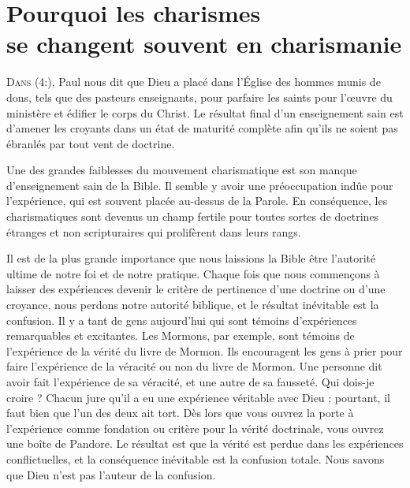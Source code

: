 \chapter[Pourquoi les charismes se changent souvent en charismanie]{Pourquoi les charismes\\ se changent souvent en charismanie}
\renewcommand{\chaphead}{{\fontspec{Linux Libertine O} Pourquoi les charismes se changent souvent en charismanie}}

\lettrine{D}{ans (4:),}
 Paul nous dit que Dieu a placé dans l'Église
 des hommes munis de dons, tels que des pasteurs enseignants,
 pour parfaire les saints pour l'œuvre du ministère et édifier le corps
 du Christ. Le résultat final d'un enseignement sain est d'amener
 les croyants dans un état de maturité complète afin qu'ils ne soient
 pas ébranlés par tout vent de doctrine.

\begin{specialpar}{}
Une des grandes faiblesses du mouvement charismatique est son manque
 d'enseignement sain de la Bible. Il semble y avoir une préoccupation
 indûe pour l'expérience, qui est souvent placée au-dessus de la Parole.
 En conséquence, les charismatiques sont devenus un champ fertile
 pour toutes sortes de doctrines étranges et non scripturaires qui prolifèrent
 dans leurs rangs.
\end{specialpar}

Il est de la plus grande importance que nous laissions la Bible être
 l'autorité ultime de notre foi et de notre pratique.
 Chaque fois que nous commençons à laisser des expériences
 devenir le critère de pertinence d'une doctrine ou d'une croyance,
 nous perdons notre autorité biblique, et le résultat inévitable
 est la confusion. Il y a tant de gens aujourd'hui qui sont témoins
 d'expériences remarquables et excitantes. Les Mormons, par exemple,
 \og sont témoins \fg{} de l'expé\-rience de la vérité du livre de Mormon.
 Ils encouragent les gens à prier pour faire l'expérience de la véracité
 ou non du livre de Mormon. Une personne dit avoir fait l'expérience
 de sa véracité, et une autre de sa fausseté. Qui dois-je croire ?
 Chacun jure qu'il a eu une expérience véritable avec Dieu ;
 pourtant, il faut bien que l'un des deux ait tort.
 Dès lors que vous ouvrez la porte à l'expérience comme fondation
 ou critère pour la vérité doctrinale, vous ouvrez une boîte de Pandore.
 Le résultat est que la vérité est perdue dans les expériences
 conflictuelles, et la conséquence inévitable est la confusion totale.
 Nous savons que Dieu n'est pas l'auteur de la confusion.


